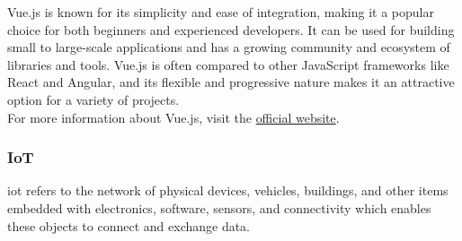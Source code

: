 Vue.js is known for its simplicity and ease of integration, making it a popular choice for both beginners and experienced developers. It can be used for building small to large-scale applications and has a growing community and ecosystem of libraries and tools. Vue.js is often compared to other JavaScript frameworks like React and Angular, and its flexible and progressive nature makes it an attractive option for a variety of projects.\vspace{5mm} \\
For more information about Vue.js, visit the \href{https://vuejs.org/}{official website}.
\subsubsection{IoT}
\gls{iot} refers to the network of physical devices, vehicles, buildings, and other items embedded with electronics, software, sensors, and connectivity which enables these objects to connect and exchange data.
